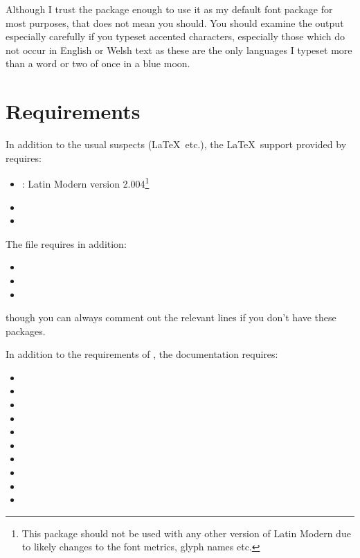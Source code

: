 \documentclass[11pt,british,a4paper]{article}
\begin{document}
Although I trust the package enough to use it as my default font package for most purposes, that does not mean you should. You should examine the output especially carefully if you typeset accented characters, especially those which do not occur in English or Welsh text as these are the only languages I typeset more than a word or two of once in a blue moon.

\section{Requirements}\label{sec:require}

In addition to the usual suspects (\LaTeX\ etc.), the \LaTeX\ support provided by  requires:
\begin{itemize}
	\item {}: Latin Modern version 2.004\footnote{This package should not be used with any other version of Latin Modern due to likely changes to the font metrics, glyph names etc.}
	\item {}
	\item {}
\end{itemize}

The file  requires in addition:
\begin{itemize}
	\item {}
	\item {}
	\item {}
\end{itemize}
though you can always comment out the relevant lines if you don't have these packages.

In addition to the requirements of , the documentation requires:
\begin{itemize}
	\item {}
	\item {}
	\item {}
	\item {}
	\item {}
	\item {}
	\item {}
	\item {}
	\item {}
	\item {}
\end{itemize}
\end{document}
